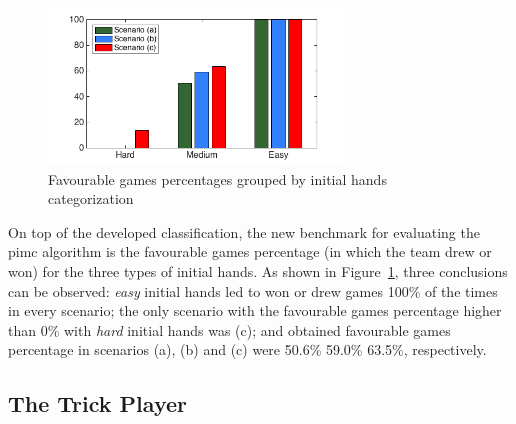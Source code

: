 \begin{figure}[h!]
  \centering
    \includegraphics[width=0.7\textwidth]{./img/5/classifiedPercentages}
  \caption{Favourable games percentages grouped by initial hands categorization}
\label{fig:classifiedPercentages}
\end{figure}

On top of the developed classification, the new benchmark for evaluating the \ac{pimc} algorithm is the favourable games percentage (in which the team drew or won) for the three types of initial hands.
As shown in Figure~\ref{fig:classifiedPercentages}, three conclusions can be observed: \emph{easy} initial hands led to won or drew games 100\% of the times in every scenario; the only scenario with the favourable games percentage higher than 0\% with \emph{hard} initial hands was (c); and obtained favourable games percentage in scenarios (a), (b) and (c) were 50.6\% 59.0\% 63.5\%, respectively.

\subsection{The Trick Player}






